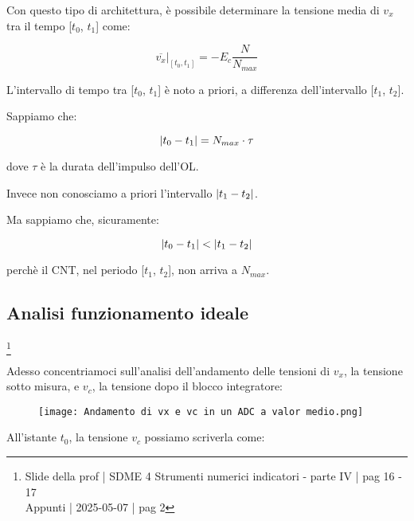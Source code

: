 Con questo tipo di architettura, è possibile determinare la tensione media di $v_x$ tra il tempo [$t_0$, $t_1$] come: 

{
    \Large 
    \begin{equation}
        \left.
        \overline{v_x}
        \right|_{[t_0, t_1]}
        = 
        - E_c 
        \frac{N}{N_{max}}
    \end{equation}
}

L'intervallo di tempo tra [$t_0$, $t_1$] è noto a priori, a differenza dell'intervallo [$t_1$, $t_2$]. \newline 

Sappiamo che: 

{
    \Large 
    \begin{equation}
        \abs{t_0 - t_1} = N_{max} \cdot \tau
    \end{equation}
}

dove $\tau$ è la durata dell'impulso dell'OL. \newline 

Invece non conosciamo a priori l'intervallo $\abs{t_1 - t_2}$. \newline 

Ma sappiamo che, sicuramente: 

{
    \Large 
    \begin{equation}
        \abs{t_0 - t_1} 
        <
        \abs{t_1 - t_2}
    \end{equation}
}

perchè il CNT, nel periodo [$t_1$, $t_2$], non arriva a $N_{max}$. \newline 

\newpage 

\subsection{Analisi funzionamento ideale}
\footnote{Slide della prof | SDME 4 Strumenti numerici indicatori - parte IV | pag 16 - 17\\  
Appunti | 2025-05-07 | pag 2}

Adesso concentriamoci sull'analisi dell'andamento delle tensioni di $v_x$, la tensione sotto misura, e $v_c$, la tensione dopo il blocco integratore: 

\begin{figure}[h]
    \centering
    \texttt{[image: Andamento di vx e vc in un ADC a valor medio.png]}
\end{figure}

All'istante $t_0$, la tensione $v_c$ possiamo scriverla come:

